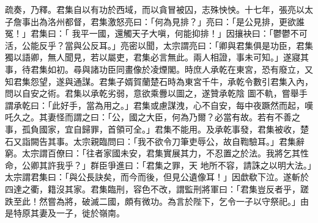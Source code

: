 \begin{pinyinscope}
 疏奏，乃釋。君集自以有功於西域，而以貪冒被囚，志殊怏怏。十七年，張亮以太子詹事出為洛州都督，君集激怒亮曰：「何為見排？」亮曰：「是公見排，更欲誰冤！」君集曰：「
 我平一國，還觸天子大嗔，何能抑排！」因攘袂曰：「鬱鬱不可活，公能反乎？當與公反耳。」亮密以聞，太宗謂亮曰：「卿與君集俱是功臣，君集獨以語卿，無人聞見，若以屬吏，君集必言無此。兩人相證，事未可知。」遂寢其事，待君集如初。尋與諸功臣同畫像於凌煙閣。時庶人承乾在東宮，恐有廢立，又知君集怨望，遂與通謀。君集子婿賀蘭楚石時為東宮千牛，承乾令數引君集入內，問以自安之術。君集以承乾劣弱，意欲乘釁以圖之，遂贊承乾陰
 圖不軌，嘗舉手謂承乾曰：「此好手，當為用之。」君集或慮謀洩，心不自安，每中夜蹶然而起，嘆吒久之。其妻怪而謂之曰：「公，國之大臣，何為乃爾？必當有故。若有不善之事，孤負國家，宜自歸罪，首領可全。」君集不能用。及承乾事發，君集被收，楚石又詣闕告其事。太宗親臨問曰：「我不欲令刀筆吏辱公，故自鞫驗耳。」君集辭窮。太宗謂百僚曰：「往者家國未安，君集實展其力，不忍置之於法。我將乞其性命，公卿其許我乎？」群臣爭進曰：「君集之罪，天
 地所不容，請誅之以明大法。」太宗謂君集曰：「與公長訣矣，而今而後，但見公遺像耳！」因歔欷下泣。遂斬於四達之衢，籍沒其家。君集臨刑，容色不改，謂監刑將軍曰：「君集豈反者乎，蹉跌至此！然嘗為將，破滅二國，頗有微功。為言於陛下，乞令一子以守祭祀。」由是特原其妻及一子，徙於嶺南。




\end{pinyinscope}
